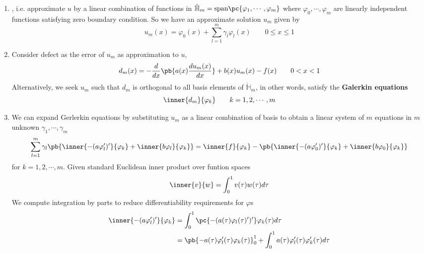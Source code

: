 \documentclass[11pt]{article}
\begin{document}
\begin{definition*}
    \begin{enumerate}
        \item {}, i.e. approximate $u$ by a linear combination of functions in $\mathring{\mathbb{H}}_m = \text{span}\pc{
            \varphi_1, \cdots, \varphi_m
        }$ where $\varphi_0,\cdots, \varphi_m$ are linearly independent functions satisfying zero boundary condition. So we have an approximate solution $u_m$ given by 
        \[
            u_m(x) = \varphi_0(x) + \sum_{l=1}^m \gamma_l \varphi_l(x)
            \quad \quad 0\leq x \leq 1    
        \]
        \item {} Consider defect as the error of $u_m$ as approximation to $u$,
        \[
            d_m(x) = -\frac{d}{dx} \pb{a(x) \frac{du_m(x)}{dx}} + b(x)u_m(x)- f(x)
            \quad \quad 0 < x < 1
        \]
        Alternatively, we seek $u_m$ such that $d_m$ is orthogonal to all basis elements of $\mathring{\mathbb{H}}_m$, in other words, satisfy the \textbf{Galerkin equations}
        \[
            \inner{d_m}{\varphi_k} \quad \quad k = 1,2,\cdots,m    
        \]
        \item {} We can expand Gerlerkin equations by substituting $u_m$ as a linear combination of basis to obtain a linear system of $m$ equations in $m$ unknown $\gamma_1,\cdots,\gamma_m$
        \[
            \sum_{l=1}^m \gamma_l \pb{
                \inner{-(a\varphi_l')'}{\varphi_k} + \inner{b\varphi_l}{\varphi_k}
            }
            = \inner{f}{\varphi_k} - \pb{
                \inner{-(a\varphi_0')'}{\varphi_k} + \inner{b\varphi_0}{\varphi_k}
            }
        \]
        for $k=1,2,\cdots,m$. Given standard Euclidean inner product over funtion spaces 
        \[
            \inner{v}{w} = \int_0^1 v(\tau) w(\tau) d\tau
        \]
        We compute integration by parts to reduce differentiability requirements for $\varphi$s
        \begin{align*}
            \inner{-(a\varphi_l')'}{\varphi_k}
            &= \int_0^1 \pc{-(a(\tau)\varphi_l(\tau)')'}\varphi_k(\tau) d\tau \\ 
            &= \pb{-a(\tau) \varphi_l'(\tau) \varphi_k(\tau)}_0^1 + \int_0^1 a(\tau) \varphi_l'(\tau) \varphi_k'(\tau) d\tau  \\

\end{align*}
\end{enumerate}
\end{definition*}
\end{document}
